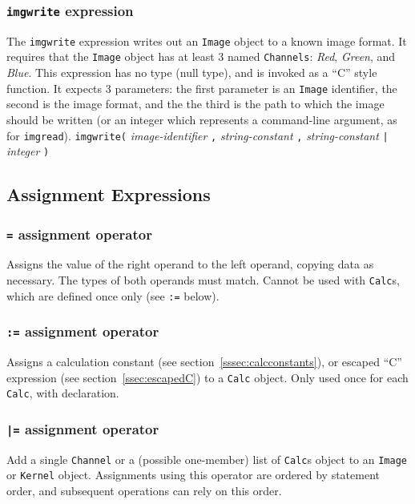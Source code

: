 \subsubsection{\texttt{imgwrite} expression}
\label{sssec:imgwrite}
The \texttt{imgwrite} expression writes out an \texttt{Image} object to a known
image format. It requires that the \texttt{Image} object has at least 3 named
\texttt{Channels}: \emph{Red}, \emph{Green}, and \emph{Blue}.
This expression has no type (null type), and is invoked as a ``C'' style function.
It expects 3 parameters: the first parameter is an \texttt{Image} identifier, the
second is the image format, and the the third is the path to which the image
should be written (or an integer which represents a command-line argument, as for
\texttt{imgread}).
\startsyn
\texttt{imgwrite(} \emph{image-identifier} \texttt{,} \emph{string-constant} \texttt{,} \emph{string-constant} \texttt{|} \emph{integer} \texttt{)}
\stopsyn

\subsection{Assignment Expressions}
\label{ssec:assignment}

\subsubsection{\texttt{=} assignment operator}
\label{sssec:equalop}
Assigns the value of the right operand to the left operand, copying data as necessary.
The types of both operands must match. Cannot be used with \texttt{Calc}s, which are
defined once only (see \texttt{:=} below).

\subsubsection{\texttt{:=} assignment operator}
\label{sssec:colonequalop}
Assigns a calculation constant (see section~\ref{sssec:calcconstants}), or
escaped ``C'' expression (see section~\ref{ssec:escapedC}) to a \texttt{Calc}
object. Only used once for each \texttt{Calc}, with declaration.

\subsubsection{\texttt{|=} assignment operator}
\label{sssec:barequalop}
Add a single \texttt{Channel} or a (possible one-member) list of \texttt{Calc}s object to an \texttt{Image} or
\texttt{Kernel} object. Assignments using this operator are ordered by statement
order, and subsequent operations can rely on this order.
